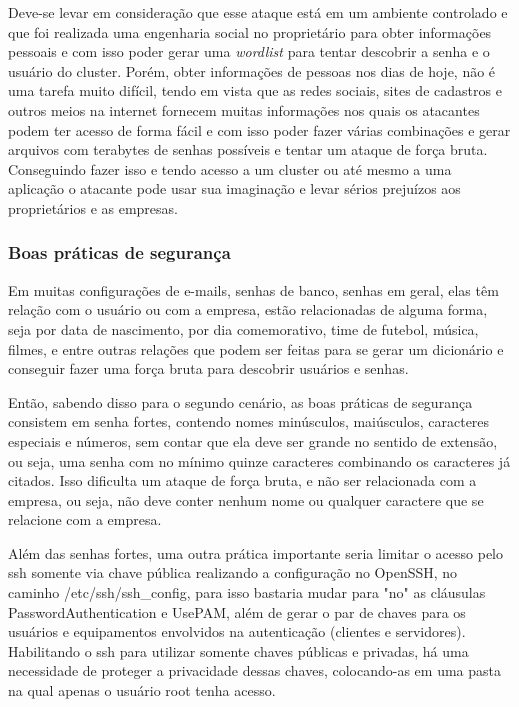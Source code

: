 Deve-se levar em consideração que esse ataque está em um ambiente controlado e que foi realizada uma engenharia social no proprietário para obter informações pessoais e com isso poder gerar uma \textit{wordlist} para tentar descobrir a senha e o usuário do cluster. Porém, obter informações de pessoas nos dias de hoje, não é uma tarefa muito difícil, tendo em vista que as redes sociais, sites de cadastros e outros meios na internet fornecem muitas informações nos quais os atacantes podem ter acesso de forma fácil e com isso poder fazer várias combinações e gerar arquivos com terabytes de senhas possíveis e tentar um ataque de força bruta. Conseguindo fazer isso e tendo acesso a um cluster ou até mesmo a uma aplicação o atacante pode usar sua imaginação e levar sérios prejuízos aos proprietários e as empresas.

\subsubsection{Boas práticas de segurança}

Em muitas configurações de e-mails, senhas de banco, senhas em geral, elas têm relação com o usuário ou com a empresa, estão relacionadas de alguma forma, seja por data de nascimento, por dia comemorativo, time de futebol, música, filmes, e entre outras relações que podem ser feitas para se gerar um dicionário e conseguir fazer uma força bruta para descobrir usuários e senhas.

Então, sabendo disso para o segundo cenário, as boas práticas de segurança consistem em senha fortes, contendo nomes minúsculos, maiúsculos, caracteres especiais e números, sem contar que ela deve ser grande no sentido de extensão, ou seja, uma senha com no mínimo quinze caracteres combinando os caracteres já citados. Isso dificulta um ataque de força bruta, e não ser relacionada com a empresa, ou seja, não deve conter nenhum nome ou qualquer caractere que se relacione com a empresa. 

Além das senhas fortes, uma outra prática importante seria limitar o acesso pelo ssh somente via chave pública realizando a configuração no OpenSSH, no caminho /etc/ssh/ssh\_config, para isso bastaria mudar para "no" as cláusulas PasswordAuthentication e UsePAM, além de gerar o par de chaves para os usuários e equipamentos envolvidos na autenticação (clientes e servidores). Habilitando o ssh para utilizar somente chaves públicas e privadas, há uma necessidade de proteger a privacidade dessas chaves, colocando-as em uma pasta na qual apenas o usuário root tenha acesso.

